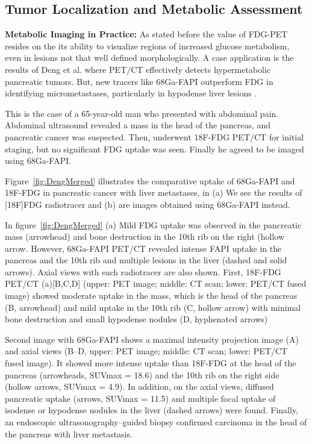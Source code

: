 
\begin{multicols}{2}

\subsection{Tumor Localization and Metabolic Assessment}

\textbf{Metabolic Imaging in Practice:} As stated before the value of FDG-PET resides on the its ability to visualize regions of increased glucose metabolism, even in lesions not that well defined morphologically. A case application is the results of Deng et al. where PET/CT effectively detects hypermetabolic pancreatic tumors. But, new tracers like 68Ga-FAPI outperform FDG in identifying micrometastases, particularly in hypodense liver lesions \cite{Deng2021}. %

This is the case of a 65-year-old man who presented with abdominal pain. Abdominal ultrasound revealed a mass in the head of the pancreas, and pancreatic cancer was suspected. Then, underwent 18F-FDG PET/CT for initial staging, but no significant FDG uptake was seen. Finally he agreed to be imaged using 68Ga-FAPI.

Figure~\ref{fig:DengMerged} illustrates the comparative uptake of 68Ga-FAPI and 18F-FDG in pancreatic cancer with liver metastases, in (a) We see the results of [18F]FDG radiotracer and (b) are images obtained using 68Ga-FAPI instead.

In figure~\ref{fig:DengMerged} (a) Mild FDG uptake was observed in the pancreatic mass (arrowhead) and bone destruction in the 10th rib on the right (hollow arrow. However, 68Ga-FAPI PET/CT revealed intense FAPI uptake in the pancreas and the 10th rib and multiple lesions in the liver (dashed and solid arrows). Axial views with each radiotracer are also shown. First, 18F-FDG PET/CT (a)[B,C,D] (upper: PET image; middle: CT scan; lower: PET/CT fused image) showed moderate uptake in the mass, which is the head of the pancreas (B, arrowhead) and mild uptake in the 10th rib (C, hollow arrow) with minimal bone destruction and small hypodense nodules (D, hyphenated arrows)

Second image with 68Ga-FAPI shows a maximal intensity projection image (A) and axial views (B–D, upper: PET image; middle: CT scan; lower: PET/CT fused image). It showed more intense uptake than 18F-FDG at the head of the pancreas (arrowheads, SUVmax = 18.6) and the 10th rib on the right side (hollow arrows, SUVmax = 4.9). In addition, on the axial views, diffused pancreatic uptake (arrows, SUVmax = 11.5) and multiple focal uptake of isodense or hypodense nodules in the liver (dashed arrows) were found. Finally, an endoscopic ultrasonography–guided biopsy confirmed carcinoma in the head of the pancreas with liver metastasis. 


\end{multicols}
